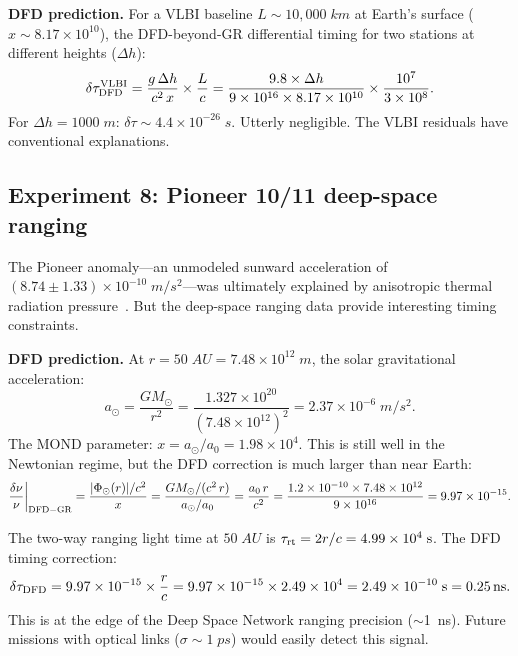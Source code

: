 \documentclass[aps,prd,twocolumn,superscriptaddress,nofootinbib,longbibliography]{revtex4-2}
\newcommand{\ns}{\,\mathrm{ns}}
\begin{document}
\textbf{DFD prediction.} For a VLBI baseline $L \sim 10{,}000\;\si{km}$
at Earth's surface ($x \sim 8.17\times10^{10}$), the DFD-beyond-GR
differential timing for two stations at different heights ($\Delta h$):
\begin{equation}
\delta\tau_{\rm DFD}^{\rm VLBI} = \frac{g\,\Delta h}{c^2\,x}\times\frac{L}{c}
= \frac{9.8\times\Delta h}{9\times10^{16}\times8.17\times10^{10}}\times\frac{10^7}{3\times10^8}.
\end{equation}
For $\Delta h = 1000\;\si{m}$: $\delta\tau \sim 4.4\times10^{-26}\;\si{s}$.
Utterly negligible. The VLBI residuals have conventional explanations.

\subsection{Experiment 8: Pioneer 10/11 deep-space ranging}\label{sec:Pioneer}

The Pioneer anomaly---an unmodeled sunward acceleration of
$(8.74\pm1.33)\times10^{-10}\;\si{m/s^2}$---was ultimately explained
by anisotropic thermal radiation pressure~\cite{Turyshev2012}. But the
deep-space ranging data provide interesting timing constraints.

\textbf{DFD prediction.} At $r = 50\;\si{AU} = 7.48\times10^{12}\;\si{m}$,
the solar gravitational acceleration:
\begin{equation}
a_\odot = \frac{GM_\odot}{r^2} = \frac{1.327\times10^{20}}{(7.48\times10^{12})^2}
= 2.37\times10^{-6}\;\si{m/s^2}.
\end{equation}
The MOND parameter: $x = a_\odot/a_0 = 1.98\times10^4$. This is still
well in the Newtonian regime, but the DFD correction is much larger than
near Earth:
\begin{equation}
\frac{\delta\nu}{\nu}\bigg|_{\rm DFD-GR} = \frac{|\Phi_\odot(r)|/c^2}{x}
= \frac{GM_\odot/(c^2\,r)}{a_\odot/a_0}
= \frac{a_0\,r}{c^2} = \frac{1.2\times10^{-10}\times7.48\times10^{12}}{9\times10^{16}}
= 9.97\times10^{-15}.
\end{equation}

The two-way ranging light time at $50\;\si{AU}$ is $\tau_{\rm rt} = 2r/c = 4.99\times10^4\;\si{s}$.
The DFD timing correction:
\begin{equation}
\delta\tau_{\rm DFD} = 9.97\times10^{-15}\times\frac{r}{c}
= 9.97\times10^{-15}\times2.49\times10^4 = 2.49\times10^{-10}\;\si{s}
= 0.25\ns.
\end{equation}
This is at the edge of the Deep Space Network ranging precision
($\sim$1~ns). Future missions with optical links ($\sigma \sim 1\;\si{ps}$)
would easily detect this signal.
\end{document}
